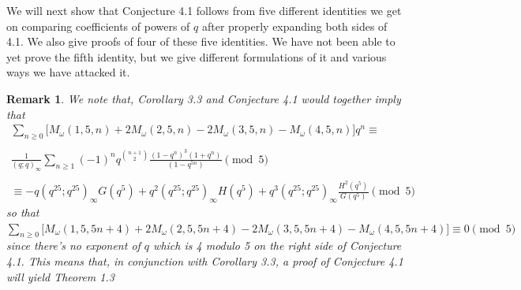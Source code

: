 \documentclass[10pt,reqno]{amsart}
\newtheorem{remark}[]{Remark}
\begin{document}
We will next show that Conjecture 4.1 follows from five different identities we get on comparing coefficients of powers of $q$ after properly expanding both sides of 4.1. We also give proofs of four of these five identities. We have not been able to yet prove the fifth identity, but we give different formulations of it and various ways we have attacked it. 
\begin{remark}
We note that, Corollary 3.3 and Conjecture 4.1 would together imply that 
\begin{multline}
        \displaystyle\sum_{n\geq 0}\bigg[M_{\omega}(1,5,n)+2M_{\omega}(2,5,n)-2M_{\omega}(3,5,n)-M_{\omega}(4,5,n)\bigg]q^n\equiv \\ \\
        \displaystyle\frac{1}{(q;q)_{\infty}}\displaystyle\sum_{n\geq 1}(-1)^nq^{\binom{n+1}{2}}\displaystyle\frac{(1-q^n)^3(1+q^n)}{(1-q^{5n})}\pmod 5 \\ \\
        \equiv -q(q^{25};q^{25})_{\infty}G(q^5)+q^2(q^{25};q^{25})_{\infty}H(q^5)+q^3(q^{25};q^{25})_{\infty}\displaystyle\frac{H^2(q^5)}{G(q^5)} \pmod 5
\end{multline}
so that $\displaystyle\sum_{n\geq 0}\bigg[M_{\omega}(1,5,5n+4)+2M_{\omega}(2,5,5n+4)-2M_{\omega}(3,5,5n+4)-M_{\omega}(4,5,5n+4)\bigg]\equiv 0\pmod 5$ since there's no exponent of $q$ which is 4 modulo 5 on the right side of Conjecture 4.1. This means that, in conjunction with Corollary 3.3, a proof of Conjecture 4.1 will yield Theorem 1.3
\end{remark}
\end{document}
